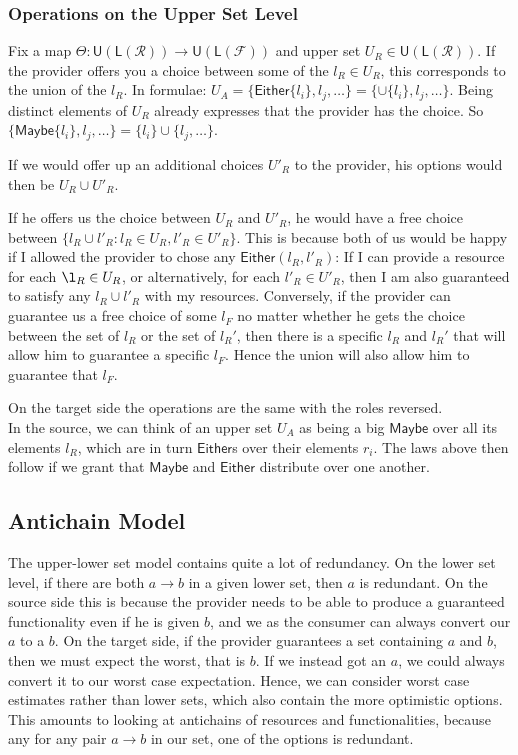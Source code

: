 \documentclass[12pt]{article}
\theoremstyle{definition}
\theoremstyle{plain}
\theoremstyle{plain}
\theoremstyle{plain}
\theoremstyle{plain}
\theoremstyle{remark}
\theoremstyle{remark}
\newcommand{\mc}[1]{\mathcal{#1}}
\newcommand{\maybe}{\mathsf{Maybe}}
\newcommand{\either}{\mathsf{Either}}
\newcommand{\low}{\mathsf{L}}
\newcommand{\upper}{\mathsf{U}}
\begin{document}
\subsubsection{Operations on the Upper Set Level}
Fix a map $\Theta: \upper(\low(\mc{R})) \rightarrow \upper(\low(\mc{F}))$ and upper set $U_R \in  \upper(\low(\mc{R}))$. If the provider offers you a choice between some of the $l_R \in U_R$, this corresponds to the union of the $l_R$. In formulae: $U_A = \{\either\{l_i\}, l_j, \ldots\} = \{\cup\{l_i\}, l_j, \ldots\}$. Being distinct elements of $U_R$ already expresses that the provider has the choice. So $\{\maybe\{l_i\},l_j,\ldots\} = \{l_i\} \cup \{l_j,\ldots\}$. 

If we would offer up an additional choices $U'_R$ to the provider, his options would then be $U_R \cup U'_R$. 

If he offers us the choice between $U_R$ and $U'_R$, he would have a free choice between $\{l_R \cup l'_R : l_R \in U_R, l'_R \in U'_R\}$. This is because both of us would be happy if I allowed the provider to chose any $\either(l_R,l'_R)$: If I can provide a resource for each $\l_R \in U_R$, or alternatively, for each $l'_R \in U'_R$, then I am also guaranteed to satisfy any $l_R \cup l'_R$ with my resources. Conversely, if the provider can guarantee us a free choice of some $l_F$ no matter whether he gets the choice between the set of $l_R$ or the set of $l_R'$, then there is a specific $l_R$ and $l_R'$ that will allow him to guarantee a specific $l_F$. Hence the union will also allow him to guarantee that $l_F$.

On the target side the operations are the same with the roles reversed. \\

In the source, we can think of an upper set $U_A$ as being a big $\maybe$ over all its elements $l_R$, which are in turn $\either$s over their elements $r_i$. The laws above then follow if we grant that $\maybe$ and $\either$ distribute over one another.

\subsection{Antichain Model}
The upper-lower set model contains quite a lot of redundancy. On the lower set level, if there are both $a \rightarrow b$ in a given lower set, then $a$ is redundant. On the source side this is because the provider needs to be able to produce a guaranteed functionality even if he is given $b$, and we as the consumer can always convert our $a$ to a $b$. On the target side, if the provider guarantees a set containing $a$ and $b$, then we must expect the worst, that is $b$. If we instead got an $a$, we could always convert it to our worst case expectation. Hence, we can consider worst case estimates rather than lower sets, which also contain the more optimistic options. This amounts to looking at antichains of resources and functionalities, because any for any pair $a \rightarrow b$ in our set, one of the options is redundant.
\end{document}
